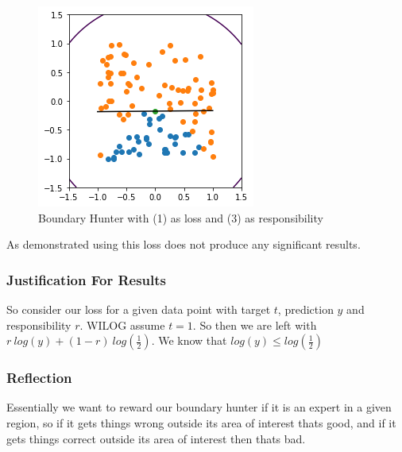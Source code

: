 \documentclass{article}
\theoremstyle{definition}
\begin{document}
\begin{figure}[H]
\centering
  \begin{minipage}[b]{0.4\textwidth}
    \includegraphics[width=\textwidth]{BoundaryHunter-Attempt1-01.png}
    \caption{Boundary Hunter with (1) as loss and (3) as responsibility}
  \end{minipage}
  \hfill
\end{figure}

As demonstrated using this loss does not produce any significant results.

\subsubsection{Justification For Results}
So consider our loss for a given data point with target $t$, prediction $y$ and responsibility $r$. WILOG assume $t = 1$. So then we are left with $r\ log(y) + (1-r)\ log(\frac{1}{2})$. We know that $log(y) \leq log(\frac{1}{2})$

\subsubsection{Reflection}
Essentially we want to reward our boundary hunter if it is an expert in a given region, so if it gets things wrong outside its area of interest thats good, and if it gets things correct outside its area of interest then thats bad.
\end{document}
